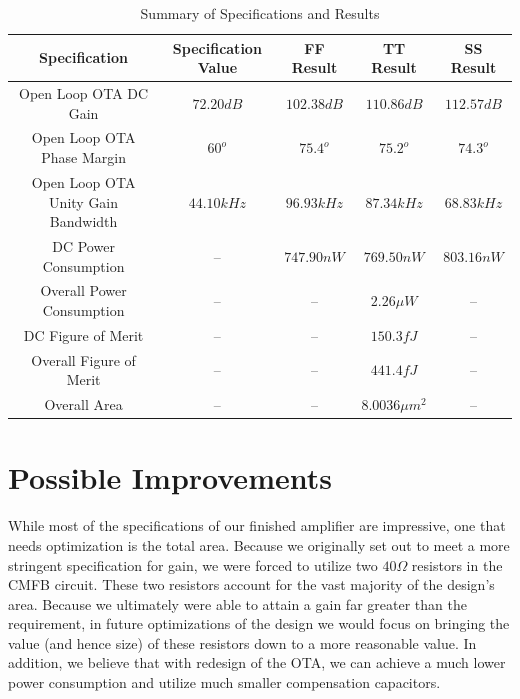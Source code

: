 \documentclass[journal]{IEEEtran}
\begin{document}
\begin{table}
\centering
\caption{Summary of Specifications and Results}
\label{tab:specs_results}
\begin{tabular}{|c|c|c|c|c|}
\hline Specification & Specification Value & FF Result & TT Result & SS Result\\ 
\hline Open Loop OTA DC Gain & $72.20 dB$ &$102.38 dB$&$110.86 dB$&$112.57 dB$\\ 
\hline Open Loop OTA Phase Margin & $60^o$ & $75.4^o$ & $75.2^o$ & $74.3^o$ \\ 
\hline Open Loop OTA Unity Gain Bandwidth & $44.10kHz$ & $96.93kHz$ & $87.34 kHz$ &  $68.83 kHz$ \\ 
\hline DC Power Consumption & -- & $747.90 nW$ & $769.50 nW$ & $803.16 nW$\\ 
\hline Overall Power Consumption & -- & -- & $2.26\mu W$ & --\\ 
\hline DC Figure of Merit & -- & -- & $150.3 fJ$ & --\\ 
\hline Overall Figure of Merit & -- & -- & $441.4 fJ$ & --\\ 
\hline Overall Area & -- & -- & $8.0036 \mu m^2$ & -- \\ 
\hline 
\end{tabular} 
\end{table}


\section{Possible Improvements}
While most of the specifications of our finished amplifier are impressive, one that needs optimization is the total area. Because we originally set out to meet a more stringent specification for gain, we were forced to utilize two $40\Omega$ resistors in the CMFB circuit. These two resistors account for the vast majority of the design's area. Because we ultimately were able to attain a gain far greater than the requirement, in future optimizations of the design we would focus on bringing the value (and hence size) of these resistors down to a more reasonable value. In addition, we believe that with redesign of the OTA, we can achieve a much lower power consumption and utilize much smaller compensation capacitors.
\end{document}
